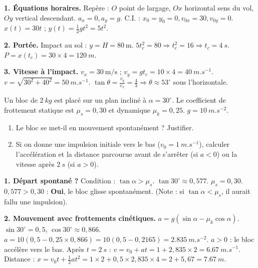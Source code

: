 \documentclass[11pt]{article}
\begin{document}
\begin{corrige}
\textbf{1. Équations horaires.}
Repère : $O$ point de largage, $Ox$ horizontal sens du vol, $Oy$ vertical descendant.
$a_x=0, a_y=g$. C.I. : $x_0=y_0=0, v_{0x}=30, v_{0y}=0$.
$x(t)=30t$ ; $y(t)=\frac{1}{2}gt^2=5t^2$.

\textbf{2. Portée.}
Impact au sol : $y=H=80\ \text{m}$.
$5t_c^2=80 \Rightarrow t_c^2=16 \Rightarrow t_c=\SI{4}{s}$.
$P=x(t_c)=30\times 4=\SI{120}{m}$.

\textbf{3. Vitesse à l'impact.}
$v_x=30\ \text{m/s}$ ; $v_y=gt_c=10\times 4=\SI{40}{m.s^{-1}}$.
$v=\sqrt{30^2+40^2}=\SI{50}{m.s^{-1}}$.
$\tan\theta=\frac{v_y}{v_x}=\frac{4}{3} \Rightarrow \theta\approx 53^{\circ}$ sous l'horizontale.
\end{corrige}

\begin{exercice}
Un bloc de $\SI{2}{kg}$ est placé sur un plan incliné à $\alpha=30^{\circ}$. Le coefficient de frottement statique est $\mu_s=0,30$ et dynamique $\mu_k=0,25$. $g=\SI{10}{m.s^{-2}}$.
\begin{enumerate}
\item Le bloc se met-il en mouvement spontanément ? Justifier.
\item Si on donne une impulsion initiale vers le bas ($v_0=\SI{1}{m.s^{-1}}$), calculer l'accélération et la distance parcourue avant de s'arrêter (si $a<0$) ou la vitesse après $\SI{2}{s}$ (si $a>0$).
\end{enumerate}
\end{exercice}

\begin{corrige}
\textbf{1. Départ spontané ?}
Condition : $\tan\alpha > \mu_s$.
$\tan 30^{\circ} \approx 0,577$. $\mu_s=0,30$.
$0,577 > 0,30$ : \textbf{Oui}, le bloc glisse spontanément.
(Note : si $\tan\alpha < \mu_s$, il aurait fallu une impulsion).

\textbf{2. Mouvement avec frottements cinétiques.}
$a = g(\sin\alpha - \mu_k\cos\alpha)$.
$\sin 30^{\circ}=0,5$, $\cos 30^{\circ}\approx 0,866$.
$a = 10(0,5 - 0,25\times 0,866) = 10(0,5 - 0,2165) = \SI{2,835}{m.s^{-2}}$.
$a>0$ : le bloc accélère vers le bas.
Après $t=\SI{2}{s}$ : $v = v_0 + at = 1 + 2,835\times 2 = \SI{6,67}{m.s^{-1}}$.
Distance : $x = v_0t + \frac{1}{2}at^2 = 1\times 2 + 0,5\times 2,835\times 4 = 2 + 5,67 = \SI{7,67}{m}$.
\end{corrige}
\end{document}
